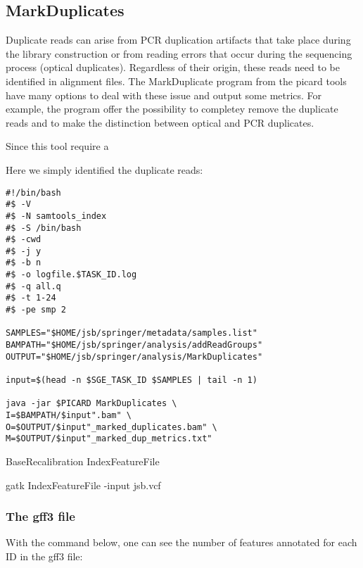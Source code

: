 \subsection{MarkDuplicates}








Duplicate reads can arise from PCR duplication artifacts that take place during the library construction or from reading errors that occur during the sequencing process (optical duplicates). Regardless of their origin, these reads need to be identified in alignment files. The MarkDuplicate program from the picard tools have many options to deal with these issue and output some metrics. For example, the program offer the possibility to completey remove the duplicate reads and to make the distinction between optical and PCR duplicates.

Since this tool require a











Here we simply identified the duplicate reads:

\begin{verbatim}
#!/bin/bash
#$ -V
#$ -N samtools_index
#$ -S /bin/bash
#$ -cwd
#$ -j y
#$ -b n
#$ -o logfile.$TASK_ID.log
#$ -q all.q
#$ -t 1-24
#$ -pe smp 2

SAMPLES="$HOME/jsb/springer/metadata/samples.list"
BAMPATH="$HOME/jsb/springer/analysis/addReadGroups"
OUTPUT="$HOME/jsb/springer/analysis/MarkDuplicates"

input=$(head -n $SGE_TASK_ID $SAMPLES | tail -n 1)

java -jar $PICARD MarkDuplicates \
I=$BAMPATH/$input".bam" \
O=$OUTPUT/$input"_marked_duplicates.bam" \
M=$OUTPUT/$input"_marked_dup_metrics.txt"
\end{verbatim}





BaseRecalibration
IndexFeatureFile

gatk IndexFeatureFile -input jsb.vcf


\subsubsection{The gff3 file}

With the command below, one can see the number of features annotated for each ID in the gff3 file: 

